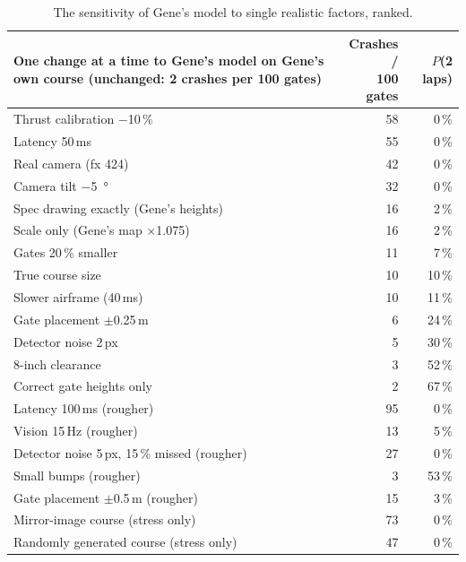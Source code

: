 
\begin{table}[H]\centering\footnotesize
\begin{tabularx}{\linewidth}{@{}Xrr@{}}
\toprule
One change at a time to Gene's model on Gene's own course (unchanged: 2 crashes per 100 gates) & \makecell{Crashes /\\100 gates} & $P$(2 laps) \\
\midrule
Thrust calibration $-$10\,\% & 58 & 0\,\% \\
Latency 50\,ms & 55 & 0\,\% \\
Real camera (fx 424) & 42 & 0\,\% \\
Camera tilt $-$\SI{5}{\degree} & 32 & 0\,\% \\
Spec drawing exactly (Gene's heights) & 16 & 2\,\% \\
Scale only (Gene's map $\times$1.075) & 16 & 2\,\% \\
Gates 20\,\% smaller & 11 & 7\,\% \\
True course size & 10 & 10\,\% \\
Slower airframe (40\,ms) & 10 & 11\,\% \\
Gate placement $\pm$0.25\,m & 6 & 24\,\% \\
Detector noise 2\,px & 5 & 30\,\% \\
8-inch clearance & 3 & 52\,\% \\
Correct gate heights only & 2 & 67\,\% \\
\midrule
Latency 100\,ms (rougher) & 95 & 0\,\% \\
Vision 15\,Hz (rougher) & 13 & 5\,\% \\
Detector noise 5\,px, 15\,\% missed (rougher) & 27 & 0\,\% \\
Small bumps (rougher) & 3 & 53\,\% \\
Gate placement $\pm$0.5\,m (rougher) & 15 & 3\,\% \\
\midrule
Mirror-image course (stress only) & 73 & 0\,\% \\
Randomly generated course (stress only) & 47 & 0\,\% \\
\bottomrule
\end{tabularx}
\caption{The sensitivity of Gene's model to single realistic factors, ranked.}\label{tab:sens}
\end{table}

